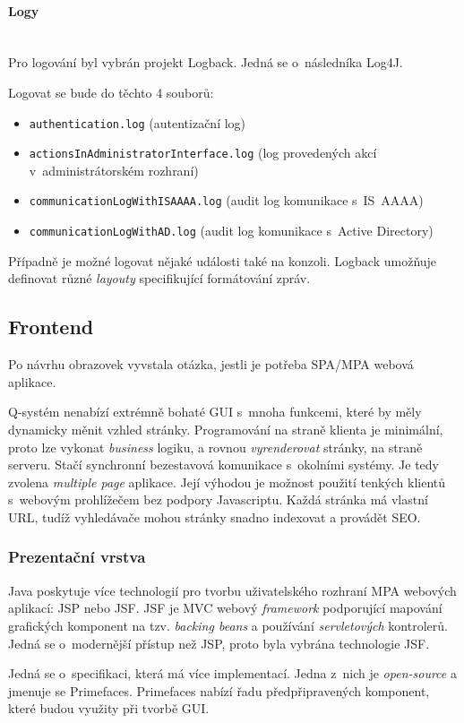 \documentclass[thesis=M,czech]{FITthesis}[2019/12/23]
\newcommand{\lbparagraph}[1]{\paragraph{#1}\mbox{}\\} %
\begin{document}
\lbparagraph{Logy\\}
\label{Logy}
Pro logování byl vybrán projekt Logback. Jedná se o~následníka Log4J.

Logovat se bude do těchto 4 souborů:
\begin{itemize}
	\item \texttt{authentication.log} (autentizační log)
	\item \texttt{actionsInAdministratorInterface.log} (log provedených akcí v~administrátorském rozhraní)
	\item \texttt{communicationLogWithISAAAA.log} (audit log komunikace s~IS~AAAA)
	\item \texttt{communicationLogWithAD.log} (audit log komunikace s~Active Directory)
\end{itemize}

Případně je možné logovat nějaké události také na konzoli.
Logback umožňuje definovat různé \textit{layouty} specifikující formátování zpráv.

\subsection{Frontend}
Po návrhu obrazovek vyvstala otázka, jestli je potřeba SPA\slash MPA webová aplikace.

Q-systém nenabízí extrémně bohaté GUI s~mnoha funkcemi, které by měly dynamicky měnit vzhled stránky.  Programování na straně klienta je minimální, proto lze vykonat \textit{business} logiku, a rovnou \textit{vyrenderovat} stránky, na straně serveru. Stačí synchronní bezestavová komunikace s~okolními systémy. Je tedy zvolena \textit{multiple page} aplikace. Její výhodou je možnost použití tenkých klientů s~webovým prohlížečem bez podpory Javascriptu. Každá stránka má vlastní URL, tudíž vyhledávače mohou stránky snadno indexovat a provádět SEO. \cite{SPAvsMPA, DontNeedSPA}

\subsubsection{Prezentační vrstva}
Java poskytuje více technologií pro tvorbu uživatelského rozhraní MPA webových aplikací: JSP nebo JSF. 
JSF je MVC webový \textit{framework} podporující mapování grafických komponent na tzv. \textit{backing beans} a používání \textit{servletových} kontrolerů. Jedná se o~modernější přístup než JSP, proto byla vybrána technologie JSF. \cite{JSPvsJSF}

Jedná se o~specifikaci, která má více implementací. Jedna z~nich je \textit{open-source} a jmenuje se Primefaces. Primefaces nabízí řadu předpřipravených komponent, které budou využity při tvorbě GUI. \cite{Primefaces}
\end{document}
